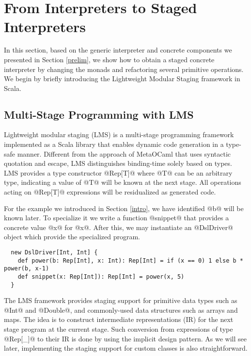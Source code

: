 \section{From Interpreters to Staged Interpreters} \label{stagedinterp}

In this section, based on the generic interpreter and concrete components we
presented in Section \ref{prelim}, we show how to obtain a staged concrete
interpreter by changing the monads and refactoring several primitive
operations. We begin by briefly introducing the Lightweight Modular Staging
framework in Scala.

\subsection{Multi-Stage Programming with LMS}

Lightweight modular staging (LMS) \cite{DBLP:conf/gpce/RompfO10} is a
multi-stage programming framework implemented as a Scala library that enables
dynamic code generation in a type-safe manner. Different from the approach of
MetaOCaml \cite{DBLP:conf/flops/Kiselyov14, DBLP:conf/gpce/CalcagnoTHL03} that
uses syntactic quotation and escape, LMS distinguishes binding-time solely based
on types. LMS provides a type constructor @Rep[T]@ where @T@ can be an arbitrary
type, indicating a value of @T@ will be known at the next stage. All operations
acting on @Rep[T]@ expressions will be residualized as generated code.

For the example we introduced in Section \ref{intro}, we have identified @b@ will 
be known later. To specialize it we write a function @snippet@ that provides a 
concrete value @x@ for @x@. After this, we may instantiate an @DslDriver@ object 
which provide the specialized program.

\begin{lstlisting}
  new DslDriver[Int, Int] {
    def power(b: Rep[Int], x: Int): Rep[Int] = if (x == 0) 1 else b * power(b, x-1)
    def snippet(x: Rep[Int]): Rep[Int] = power(x, 5)
  }
\end{lstlisting}

The LMS framework provides staging support for primitive data types such as
@Int@ and @Double@, and commonly-used data structures such as arrays and maps.
The idea is to construct intermediate representations (IR) for the next stage
program at the current stage. Such conversion from expressions of type @Rep[_]@ to
their IR is done by using the implicit design pattern. As we will see later,
implementing the staging support for custom classes is also straightforward.


